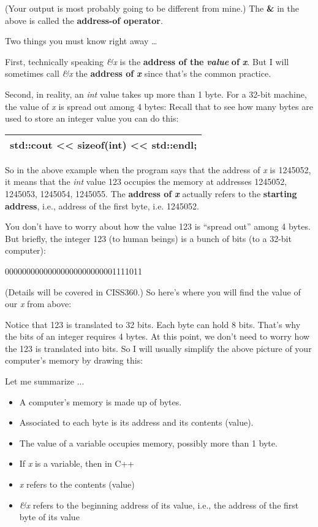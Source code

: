 \documentclass[
]{article}
\providecommand{\tightlist}{%
  \setlength{\itemsep}{0pt}\setlength{\parskip}{0pt}}
\begin{document}
(Your output is most probably going to be different from mine.) The
\textbf{\&} in the above is called the \textbf{address-of operator}.

Two things you must know right away \ldots{}

First, technically speaking \emph{\&x} is the \textbf{address of the
}\emph{\textbf{value}}\textbf{ of }\emph{\textbf{x}}. But I will
sometimes call \emph{\&x} the \textbf{address of
}\emph{\textbf{x}\textbf{ }}since that's the common practice.

Second, in reality, an \emph{int} value takes up more than 1 byte. For a
32-bit machine, the value of \emph{x} is spread out among 4 bytes:
Recall that to see how many bytes are used to store an integer value you
can do this:

\begin{longtable}[]{@{}l@{}}
\toprule
\endhead
std::cout \textless\textless{} sizeof(int) \textless\textless{}
std::endl;\tabularnewline
\bottomrule
\end{longtable}

So in the above example when the program says that the address of
\emph{x} is 1245052, it means that the \emph{int} value 123 occupies the
memory at addresses 1245052, 1245053, 1245054, 1245055. The
\textbf{address of }\emph{\textbf{x}} actually refers to the
\textbf{starting address}, i.e., address of the first byte, i.e.
1245052.

You don't have to worry about how the value 123 is ``spread out'' among
4 bytes. But briefly, the integer 123 (to human beings) is a bunch of
bits (to a 32-bit computer):

00000000000000000000000001111011

(Details will be covered in CISS360.) So here's where you will find the
value of our \emph{x} from above:

Notice that 123 is translated to 32 bits. Each byte can hold 8 bits.
That's why the bits of an integer requires 4 bytes. At this point, we
don't need to worry how the 123 is translated into bits. So I will
usually simplify the above picture of your computer's memory by drawing
this:

Let me summarize ...

\begin{itemize}
\tightlist
\item
  A computer's memory is made up of bytes.
\item
  Associated to each byte is its address and its contents (value).
\item
  The value of a variable occupies memory, possibly more than 1 byte.
\item
  If \emph{x} is a variable, then in C++
\item
  \emph{x} refers to the contents (value)
\item
  \emph{\&x} refers to the beginning address of its value, i.e., the
  address of the first byte of its value
\end{itemize}
\end{document}
